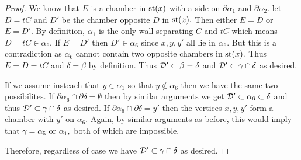 \documentclass[class=book, crop=false]{standalone}
\begin{document}
\begin{proof}
	We know that $E$ is a chamber in $\mathrm{st}(x)$ with a side on $\partial \alpha_1$ and $\partial\alpha_2.$ let $D=tC$ and $D'$ be the chamber opposite $D$ in $\mathrm{st}(x).$ Then either $E=D$ or $E=D'.$ By definition, $\alpha_1$ is the only wall separating $C$ and $tC$ which means $D=tC\in \alpha_6.$ If $E=D'$ then $D'\in \alpha_6$ since $x,y,y'$ all lie in $\alpha_6.$ But this is a contradiction as $\alpha_6$ cannot contain two opposite chambers in $\mathrm{st}(x).$ Thus $E=D=tC$ and $\delta=\beta$ by definition. Thus $\mathcal{D}'\subset \beta=\delta$ and $\mathcal{D}'\subset \gamma\cap \delta$ as desired.

	If we assume insteach that $y\in\alpha_1$ so that $y\not\in \alpha_6$ then we have the same two possibilites. If $\partial \alpha_6\cap \partial \delta=\emptyset$ then by similar arguments we get $\mathcal{D}'\subset \alpha_6\subset \delta$ and thus $\mathcal{D}'\subset \gamma\cap \delta$ as desired. If $\partial \alpha_6\cap \partial\delta=y'$ then the vertices $x,y,y'$ form a chamber with $y'$ on $\alpha_6.$ Again, by similar arguments as before, this would imply that $\gamma=\alpha_5$ or $\alpha_1,$ both of which are impossible.

	Therefore, regardless of case we have $\mathcal{D}'\subset \gamma\cap \delta$ as desired.
	

\end{proof}
%
%
\end{document}
